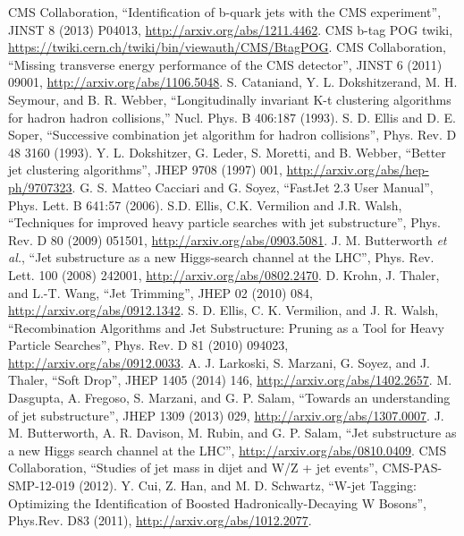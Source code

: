 \begin{thebibliography}{99}
 CMS Collaboration, ``Identification of b-quark jets with the CMS experiment'', JINST 8 (2013) P04013, {\url{http://arxiv.org/abs/1211.4462}}.
 CMS b-tag POG twiki, {\url{https://twiki.cern.ch/twiki/bin/viewauth/CMS/BtagPOG}}.
 CMS Collaboration, ``Missing transverse energy performance of the CMS detector'', JINST 6 (2011) 09001, {\url{http://arxiv.org/abs/1106.5048}}.
 S. Cataniand, Y. L. Dokshitzerand, M. H. Seymour, and B. R. Webber, ``Longitudinally
invariant K-t clustering algorithms for hadron hadron collisions,'' Nucl. Phys. B 406:187 (1993).
 S. D. Ellis and D. E. Soper, ``Successive combination jet algorithm for hadron collisions'', Phys. Rev. D 48 3160 (1993).
 {Y. L. Dokshitzer}, G. Leder, S. Moretti, and B. Webber, ``Better jet clustering algorithms'',
JHEP 9708 (1997) 001, \url{http://arxiv.org/abs/hep-ph/9707323}.
 G. S. Matteo Cacciari and G. Soyez, ``FastJet 2.3 User Manual'', Phys. Lett. B 641:57 (2006).
 S.D. Ellis, C.K. Vermilion and J.R. Walsh, ``Techniques for improved heavy particle searches
with jet substructure'', Phys. Rev. D 80 (2009) 051501, \url{http://arxiv.org/abs/0903.5081}. 
 J. M. Butterworth {\it et al.}, ``Jet substructure as a new Higgs-search channel at the LHC'',
Phys. Rev. Lett. 100 (2008) 242001, \url{http://arxiv.org/abs/0802.2470}.
 D. Krohn, J. Thaler, and L.-T. Wang, ``Jet Trimming'', JHEP 02 (2010) 084, {\url{http://arxiv.org/abs/0912.1342}}.
 S. D. Ellis, C. K. Vermilion, and J. R. Walsh, ``Recombination Algorithms and Jet
Substructure: Pruning as a Tool for Heavy Particle Searches'', Phys. Rev. D 81 (2010) 094023, \url{http://arxiv.org/abs/0912.0033}.
 A. J. Larkoski, S. Marzani, G. Soyez, and J. Thaler, ``Soft Drop'', JHEP 1405 (2014) 146, \url{http://arxiv.org/abs/1402.2657}.
 M. Dasgupta, A. Fregoso, S. Marzani, and G. P. Salam, ``Towards an understanding of jet
substructure'', JHEP 1309 (2013) 029, \url{http://arxiv.org/abs/1307.0007}.
 J. M. Butterworth, A. R. Davison, M. Rubin, and G. P. Salam, ``Jet substructure as a new
Higgs search channel at the LHC'', \url{http://arxiv.org/abs/0810.0409}.
 CMS Collaboration, ``Studies of jet mass in dijet and W/Z + jet events'', CMS-PAS-SMP-12-019 (2012).
 Y. Cui, Z. Han, and M. D. Schwartz, ``W-jet Tagging: Optimizing the Identification of Boosted Hadronically-Decaying W Bosons'', Phys.Rev. D83 (2011), \url{http://arxiv.org/abs/1012.2077}.

\end{thebibliography}
